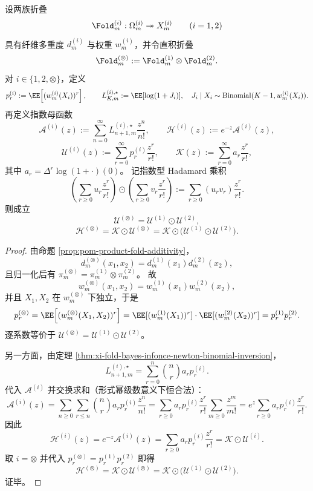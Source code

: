 \begin{theorem}\label{thm:xi-fold-product-infonce-egf-hadamard-law}
设两族折叠
\[
\Fold_m^{(i)}:\Omega_m^{(i)}\twoheadrightarrow X_m^{(i)}\qquad(i=1,2)
\]
具有纤维多重度 \(d_m^{(i)}\) 与权重 \(w_m^{(i)}\)，并令直积折叠
\[
\Fold_m^{(\otimes)}:=\Fold_m^{(1)}\otimes \Fold_m^{(2)}.
\]
对 \(i\in\{1,2,\otimes\}\)，定义
\[
p_r^{(i)}:=\EE\!\left[(w_m^{(i)}(X_i))^r\right],\qquad
L_{K,m}^{(i),\star}:=\EE[\log(1+J_i)],\quad
J_i\mid X_i\sim\mathrm{Binomial}(K-1,w_m^{(i)}(X_i)).
\]
再定义指数母函数
\[
\mathcal A^{(i)}(z):=\sum_{n=0}^{\infty}L_{n+1,m}^{(i),\star}\frac{z^n}{n!},
\qquad
\mathcal H^{(i)}(z):=e^{-z}\mathcal A^{(i)}(z),
\]
\[
\mathcal U^{(i)}(z):=\sum_{r=0}^{\infty}p_r^{(i)}\frac{z^r}{r!},
\qquad
\mathcal K(z):=\sum_{r=0}^{\infty}a_r\frac{z^r}{r!},
\]
其中 \(a_r=\Delta^r\log(1+\cdot)(0)\)。
记指数型 Hadamard 乘积
\[
\left(\sum_{r\ge 0}u_r\frac{z^r}{r!}\right)\odot
\left(\sum_{r\ge 0}v_r\frac{z^r}{r!}\right)
:=\sum_{r\ge 0}(u_rv_r)\frac{z^r}{r!}.
\]
则成立
\[
\mathcal U^{(\otimes)}=\mathcal U^{(1)}\odot\mathcal U^{(2)},
\]
\[
\mathcal H^{(\otimes)}
=\mathcal K\odot\mathcal U^{(\otimes)}
=\mathcal K\odot\bigl(\mathcal U^{(1)}\odot\mathcal U^{(2)}\bigr).
\]
\end{theorem}
\begin{proof}
由命题 \ref{prop:pom-product-fold-additivity}，
\[
d_m^{(\otimes)}(x_1,x_2)=d_m^{(1)}(x_1)d_m^{(2)}(x_2),
\]
且归一化后有 \(\pi_m^{(\otimes)}=\pi_m^{(1)}\otimes\pi_m^{(2)}\)。
故
\[
w_m^{(\otimes)}(x_1,x_2)=w_m^{(1)}(x_1)w_m^{(2)}(x_2),
\]
并且 \(X_1,X_2\) 在 \(w_m^{(\otimes)}\) 下独立，于是
\[
p_r^{(\otimes)}
=\EE\!\left[(w_m^{(\otimes)}(X_1,X_2))^r\right]
=\EE[(w_m^{(1)}(X_1))^r]\cdot \EE[(w_m^{(2)}(X_2))^r]
=p_r^{(1)}p_r^{(2)}.
\]
逐系数等价于
\(
\mathcal U^{(\otimes)}=\mathcal U^{(1)}\odot\mathcal U^{(2)}
\)。
\par
另一方面，由定理 \ref{thm:xi-fold-bayes-infonce-newton-binomial-inversion}，
\[
L_{n+1,m}^{(i),\star}
=\sum_{r=0}^{n}\binom{n}{r}a_r p_r^{(i)}.
\]
代入 \(\mathcal A^{(i)}\) 并交换求和（形式幂级数意义下恒合法）：
\[
\mathcal A^{(i)}(z)
=\sum_{n\ge 0}\sum_{r\le n}\binom{n}{r}a_r p_r^{(i)}\frac{z^n}{n!}
=\sum_{r\ge 0}a_r p_r^{(i)}\frac{z^r}{r!}\sum_{m\ge 0}\frac{z^m}{m!}
=e^z\sum_{r\ge 0}a_r p_r^{(i)}\frac{z^r}{r!}.
\]
因此
\[
\mathcal H^{(i)}(z)
=e^{-z}\mathcal A^{(i)}(z)
=\sum_{r\ge 0}a_r p_r^{(i)}\frac{z^r}{r!}
=\mathcal K\odot\mathcal U^{(i)}.
\]
取 \(i=\otimes\) 并代入 \(p_r^{(\otimes)}=p_r^{(1)}p_r^{(2)}\) 即得
\[
\mathcal H^{(\otimes)}
=\mathcal K\odot\mathcal U^{(\otimes)}
=\mathcal K\odot\bigl(\mathcal U^{(1)}\odot\mathcal U^{(2)}\bigr).
\]
证毕。
\end{proof}



\endinput
